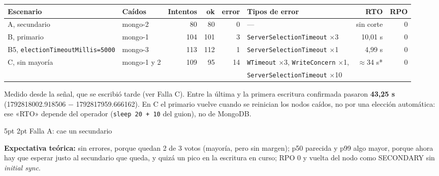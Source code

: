 \documentclass[10pt,letterpaper]{article}
\makeatletter
\renewcommand\subsection{\@startsection{subsection}{2}{\z@}%
  {5pt \@plus 1pt}{2pt}%
  {\normalfont\small\bfseries\color{acc}}}
\makeatother
\begin{document}
\begin{center}\footnotesize
\begin{tabular}{@{}llrrrlrr@{}}
\toprule
\textbf{Escenario} & \textbf{Caídos} & \textbf{Intentos} & \textbf{ok} & \textbf{error} & \textbf{Tipos de error} & \textbf{RTO} & \textbf{RPO} \\
\midrule
A, secundario & mongo-2 & 80 & 80 & 0 & --- & sin corte & 0 \\
B, primario & mongo-1 & 104 & 101 & 3 & \texttt{ServerSelectionTimeout} $\times$3 & 10,01 s & 0 \\
B5, \texttt{electionTimeoutMillis=5000} & mongo-3 & 113 & 112 & 1 & \texttt{ServerSelectionTimeout} $\times$1 & 4,99 s & 0 \\
C, sin mayoría & mongo-1 y 2 & 109 & 95 & 14 & \texttt{WTimeout} $\times$3, \texttt{WriteConcern} $\times$1, & $\approx$34 s* & 0 \\
 & & & & & \texttt{ServerSelectionTimeout} $\times$10 & & \\
\bottomrule
\end{tabular}
\end{center}
{\footnotesize * Medido desde la señal, que se escribió tarde (ver Falla C). Entre la última y la primera escritura
confirmada pasaron \textbf{43,25 s} (1792818002.918506 $-$ 1792817959.666162). En C el primario vuelve cuando se
reinician los nodos caídos, no por una elección automática: ese «RTO» depende del operador (\texttt{sleep 20 + 10}
del guion), no de MongoDB.}

\subsection{Falla A: cae un secundario}

\textbf{Expectativa teórica:} sin errores, porque quedan 2 de 3 votos (mayoría, pero sin margen); p50 parecida y p99
algo mayor, porque ahora hay que esperar justo al secundario que queda, y quizá un pico en la escritura en
curso; RPO 0 y vuelta del nodo como SECONDARY sin \emph{initial sync}.
\end{document}
